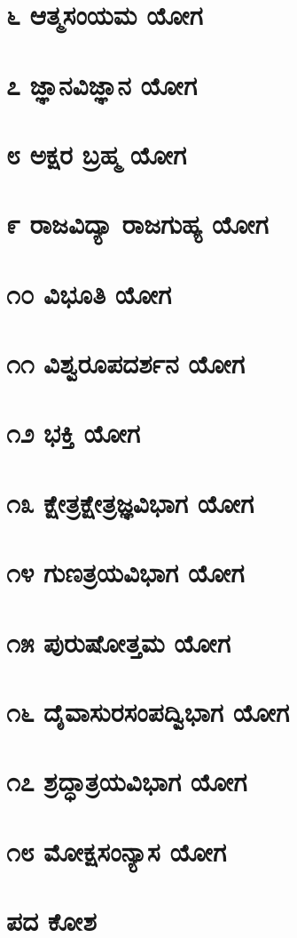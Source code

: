 \documentclass[12pt,twoside,openright,a5paper]{book}
\begin{document}
\chapter{\kanfont ೬ ಆತ್ಮಸಂಯಮ ಯೋಗ}
\chapter{\kanfont ೭ ಜ್ಞಾನವಿಜ್ಞಾನ ಯೋಗ}
\chapter{\kanfont ೮ ಅಕ್ಷರ ಬ್ರಹ್ಮ ಯೋಗ}
\chapter{\kanfont ೯ ರಾಜವಿದ್ಯಾ ರಾಜಗುಹ್ಯ ಯೋಗ}
\chapter{\kanfont ೧೦ ವಿಭೂತಿ ಯೋಗ}
\chapter{\kanfont ೧೧ ವಿಶ್ವರೂಪದರ್ಶನ ಯೋಗ}
\chapter{\kanfont ೧೨ ಭಕ್ತಿ ಯೋಗ}
\chapter{\kanfont ೧೩ ಕ್ಷೇತ್ರಕ್ಷೇತ್ರಜ್ಞವಿಭಾಗ ಯೋಗ}
\chapter{\kanfont ೧೪ ಗುಣತ್ರಯವಿಭಾಗ ಯೋಗ}
\chapter{\kanfont ೧೫ ಪುರುಷೋತ್ತಮ ಯೋಗ}
\chapter{\kanfont ೧೬ ದೈವಾಸುರಸಂಪದ್ವಿಭಾಗ ಯೋಗ}
\chapter{\kanfont ೧೭ ಶ್ರದ್ಧಾತ್ರಯವಿಭಾಗ ಯೋಗ}
\chapter{\kanfont ೧೮ ಮೋಕ್ಷಸಂನ್ಯಾಸ ಯೋಗ}
\chapter{\kanfont ಪದ ಕೋಶ}

\printindex
\end{document}
